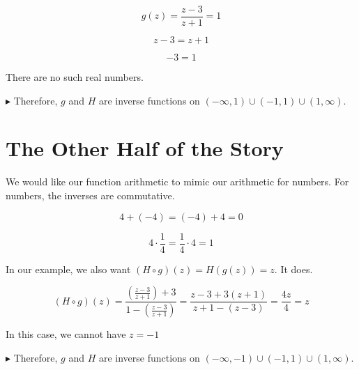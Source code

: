 \documentclass{ximera}
\begin{document}
\[
g(z) = \frac{z-3}{z+1} = 1
\]

\[
z - 3 = z + 1 
\]


\[
-3 = 1
\]


There are no such real numbers.













$\blacktriangleright$ Therefore, $g$ and $H$ are inverse functions on $(-\infty, 1) \cup (-1, 1) \cup (1,\infty)$.




















\section*{The Other Half of the Story}


We would like our function arithmetic to mimic our arithmetic for numbers.  For numbers, the inverses are commutative.

\[
4 + (-4) = (-4) + 4 = 0
\]


\[
4 \cdot \frac{1}{4} = \frac{1}{4} \cdot 4 = 1
\]



In our example, we also want $(H \circ g)(z) = H(g(z)) = z$. It does.


\[
(H \circ g)(z) = \frac{\left( \frac{z-3}{z+1} \right) + 3}{1 - \left(  \frac{z-3}{z+1}\right)} = \frac{z-3 + 3(z+1)}{z+1-(z-3)} = \frac{4z}{4} = z
\]


In this case, we cannot have $z = -1$






$\blacktriangleright$  Therefore, $g$ and $H$ are inverse functions on $(-\infty, -1) \cup (-1, 1) \cup (1, \infty)$.
\end{document}

